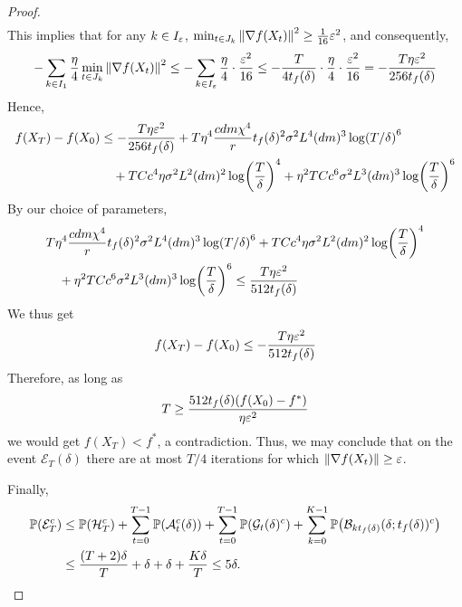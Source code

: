 \begin{proof}
\begin{align*}
    \end{align*}
    This implies that for any $k \in I_\ve$, $\min_{t \in J_k} \mg{\grad f(X_t)}^2 \geq \frac{1}{16} \ve^2$, and consequently,
    \begin{align*}
        -\sum_{k \in I_1} \frac{\eta}{4} \min_{t \in J_k} \mg{\grad f(X_t)}^2 \leq -\sum_{k \in I_\ve} \frac{\eta}{4} \cdot \frac{\ve^2}{16} \leq -\frac{T}{4t_f(\delta)} \cdot \frac{\eta}{4} \cdot \frac{\ve^2}{16} = -\frac{T \eta \ve^2}{256 t_f(\delta)}
    \end{align*}
    Hence,
    \begin{align*}
        f(X_T) - f(X_0) &\leq  -\frac{T \eta \ve^2}{256t_f(\delta)} + T \eta^4 \frac{cdm\chi^4}{r} t_f(\delta)^2 \sigma^2 L^4 (dm)^3 \log(T/\delta)^6\\
        &\quad + T C c^4 \eta \sigma^2 L^2(dm)^2 \log(\frac T\delta)^4 + \eta^2 T C c^6  \sigma^2 L^3 (dm)^3 \log(\frac T \delta)^6
    \end{align*}
    By our choice of parameters,
    \begin{align*}
        &T \eta^4 \frac{cdm\chi^4}{r} t_f(\delta)^2 \sigma^2 L^4 (dm)^3 \log(T/\delta)^6 + T C c^4 \eta \sigma^2 L^2(dm)^2 \log(\frac T\delta)^4 
        \\&\quad+ \eta^2 T C c^6  \sigma^2 L^3 (dm)^3 \log(\frac T \delta)^6 \leq \frac{T\eta \ve^2}{512 t_f(\delta)}
    \end{align*}
    We thus get
    \begin{align*}
        f(X_T) - f(X_0) \leq -\frac{T \eta \ve^2}{512 t_f(\delta)}
    \end{align*}
    Therefore, as long as
    \begin{align*}
        T \geq \frac{512t_f(\delta)(f(X_0) - f^*)}{\eta \ve^2}
    \end{align*}
    we would get $f(X_T) < f^*$, a contradiction. Thus, we may conclude that on the event $\mathcal E_T(\delta)$ there are at most $T/4$ iterations for which $\mg{\grad f(X_t)} \geq \ve$. 

    Finally,
    \begin{align*}
        \P(\mathcal E_T^c) &\leq \P(\mathcal H_T^c) + \sum_{t=0}^{T-1} \P(\mathcal A_t^c(\delta)) + \sum_{t=0}^{T-1} \P(\mathcal G_t(\delta)^c) + \sum_{k=0}^{K-1} \P(\mathcal B_{kt_f(\delta)}(\delta ; t_f(\delta))^c) \\
        &\leq \frac{(T+2)\delta}{T} + \delta + \delta + \frac{K\delta}{T} \leq 5\delta.
    \end{align*}
\end{proof}
